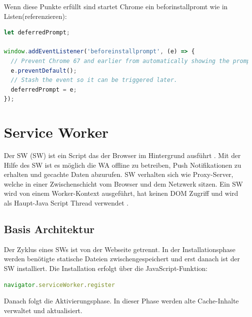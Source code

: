 \newpage
Wenn diese Punkte erfüllt sind startet Chrome ein beforinstallpromt wie in Listen(referenzieren):


\begin{lstlisting}[language=JavaScript, caption={beforinstallprompt},label=lst:beforinstallprompt, xleftmargin=50pt]
let deferredPrompt;

window.addEventListener('beforeinstallprompt', (e) => {
  // Prevent Chrome 67 and earlier from automatically showing the prompt
  e.preventDefault();
  // Stash the event so it can be triggered later.
  deferredPrompt = e;
});
\end{lstlisting}


\newpage
\section{Service Worker}
Der \acl{SW} (\acs{SW}) ist ein Script das der Browser im Hintergrund ausführt \cite{ServiceWorkerRegistration}. Mit der Hilfe des \acs{SW} ist es möglich die \acs{WA} offline zu betreiben, Push Notifikationen zu erhalten und gecachte Daten abzurufen. \acs{SW} verhalten sich wie Proxy-Server, welche in einer Zwischenschicht vom Browser und dem Netzwerk sitzen. 
Ein \acs{SW} wird von einem Worker-Kontext \cite{Worker} ausgeführt, hat keinen DOM Zugriff und wird als Haupt-Java Script Thread verwendet \cite{ServiceWorker}.

\subsection{Basis Architektur}
Der Zyklus eines \acs{SW}s ist von der Webseite getrennt.
In der Installationsphase werden benötigte statische Dateien zwischengespeichert und erst danach ist der \acs{SW} installiert. Die Installation erfolgt über die JavaScript-Funktion:

\begin{lstlisting}[language=JavaScript, caption={Service Worker Navigator},label=lst:ServiceWorkerNavigator, xleftmargin=50pt]
navigator.serviceWorker.register
\end{lstlisting}

Danach folgt die Aktivierungsphase. In dieser Phase werden alte Cache-Inhalte verwaltet und aktualisiert.


